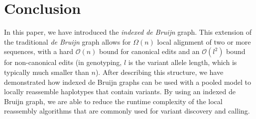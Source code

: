 \documentclass[11pt]{article}
\begin{document}
\section{Conclusion}
\label{sec:conclusion}

In this paper, we have introduced the \emph{indexed de Bruijn} graph. This extension of the traditional
\emph{de Bruijn} graph allows for $\Omega(n)$ local alignment of two or more sequences, with a hard
$\mathcal{O}(n)$ bound for canonical edits and an $\mathcal{O}(l^2)$ bound for non-canonical edits
(in genotyping, $l$ is the variant allele length, which is typically much smaller than $n$). After describing this structure, we have demonstrated how
indexed de Bruijn graphs can be used with a pooled model to locally reassemble haplotypes that contain
variants. By using an indexed de Bruijn graph, we are able to reduce the runtime complexity of the local
reassembly algorithms that are commonly used for variant discovery and calling.



\end{document}
